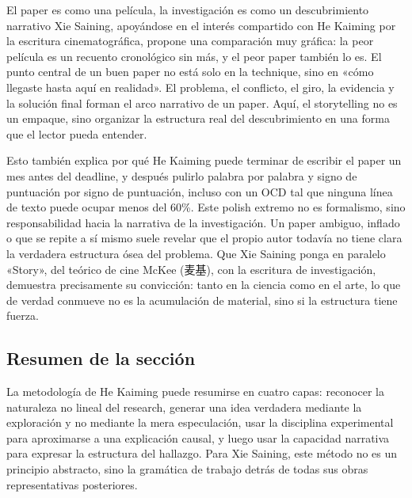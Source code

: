 \begin{importantbox}{El paper es como una película, la investigación es como un descubrimiento narrativo}
Xie Saining, apoyándose en el interés compartido con He Kaiming por la escritura cinematográfica, propone una comparación muy gráfica: la peor película es un recuento cronológico sin más, y el peor paper también lo es. El punto central de un buen paper no está solo en la technique, sino en «cómo llegaste hasta aquí en realidad». El problema, el conflicto, el giro, la evidencia y la solución final forman el arco narrativo de un paper. Aquí, el storytelling no es un empaque, sino organizar la estructura real del descubrimiento en una forma que el lector pueda entender.
\end{importantbox}

Esto también explica por qué He Kaiming puede terminar de escribir el paper un mes antes del deadline, y después pulirlo palabra por palabra y signo de puntuación por signo de puntuación, incluso con un OCD tal que ninguna línea de texto puede ocupar menos del 60\%. Este polish extremo no es formalismo, sino responsabilidad hacia la narrativa de la investigación. Un paper ambiguo, inflado o que se repite a sí mismo suele revelar que el propio autor todavía no tiene clara la verdadera estructura ósea del problema. Que Xie Saining ponga en paralelo «Story», del teórico de cine McKee (麦基), con la escritura de investigación, demuestra precisamente su convicción: tanto en la ciencia como en el arte, lo que de verdad conmueve no es la acumulación de material, sino si la estructura tiene fuerza.

\subsection{Resumen de la sección}

La metodología de He Kaiming puede resumirse en cuatro capas: reconocer la naturaleza no lineal del research, generar una idea verdadera mediante la exploración y no mediante la mera especulación, usar la disciplina experimental para aproximarse a una explicación causal, y luego usar la capacidad narrativa para expresar la estructura del hallazgo. Para Xie Saining, este método no es un principio abstracto, sino la gramática de trabajo detrás de todas sus obras representativas posteriores.
